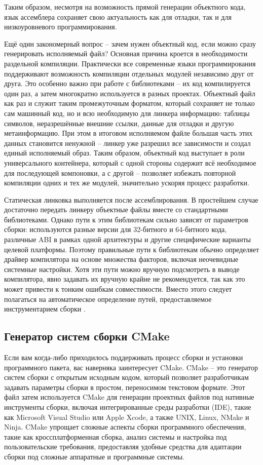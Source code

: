 Таким образом, несмотря на возможность прямой генерации объектного кода, язык ассемблера сохраняет свою актуальность как для отладки, так и для низкоуровневого программирования.

Ещё один закономерный вопрос -- зачем нужен объектный код, если можно сразу генерировать исполняемый файл? Основная причина кроется в необходимости раздельной компиляции. Практически все современные языки программирования поддерживают возможность компиляции отдельных модулей независимо друг от друга. Это особенно важно при работе с библиотеками -- их код компилируется один раз, а затем многократно используется в разных проектах. Объектный файл как раз и служит таким промежуточным форматом, который сохраняет не только сам машинный код, но и всю необходимую для линкера информацию: таблицы символов, неразрешённые внешние ссылки, данные для отладки и другую метаинформацию. При этом в итоговом исполняемом файле большая часть этих данных становится ненужной -- линкер уже разрешил все зависимости и создал единый исполняемый образ. Таким образом, объектный код выступает в роли универсального контейнера, который с одной стороны содержит всё необходимое для последующей компоновки, а с другой -- позволяет избежать повторной компиляции одних и тех же модулей, значительно ускоряя процесс разработки.

Статическая линковка выполняется после ассемблирования. В простейшем случае достаточно передать линкеру объектные файлы вместе со стандартными библиотеками. Однако пути к этим библиотекам сильно зависят от параметров сборки: используются разные версии для 32-битного и 64-битного кода, различные ABI в рамках одной архитектуры и другие специфические варианты целевой платформы. Поэтому правильные пути к библиотекам обычно определяет драйвер компилятора на основе множества факторов, включая неочевидные системные настройки. Хотя эти пути можно вручную подсмотреть в выводе компилятора, явно задавать их вручную крайне не рекомендуется, так как это может привести к тонким ошибкам совместимости. Вместо этого следует полагаться на автоматическое определение путей, предоставляемое инструментарием сборки \cite{Vladimirov2024}.

\subsection{Генератор систем сборки CMake}

Если вам когда-либо приходилось поддерживать процесс сборки и установки программного пакета, вас наверняка заинтересует CMake. CMake -- это генератор систем сборки с открытым исходным кодом, который позволяет разработчикам задавать параметры сборки в простом, переносимом текстовом формате. Этот файл затем используется CMake для генерации проектных файлов под нативные инструменты сборки, включая интегрированные среды разработки (IDE), такие как Microsoft Visual Studio или Apple Xcode, а также UNIX, Linux, NMake и Ninja. CMake упрощает сложные аспекты сборки программного обеспечения, такие как кроссплатформенная сборка, анализ системы и настройка под пользовательские требования, предоставляя удобные средства для адаптации сборки под сложные аппаратные и программные системы.

